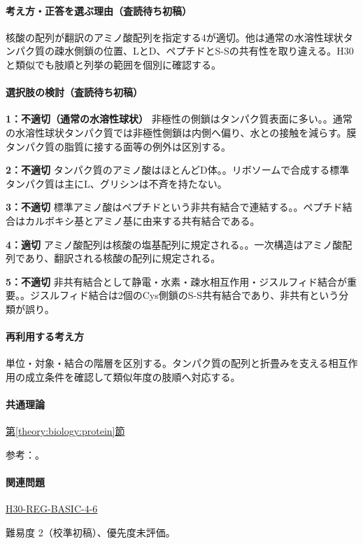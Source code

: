 \paragraph{考え方・正答を選ぶ理由（査読待ち初稿）} 核酸の配列が翻訳のアミノ酸配列を指定する4が適切。他は通常の水溶性球状タンパク質の疎水側鎖の位置、LとD、ペプチドとS-Sの共有性を取り違える。H30と類似でも肢順と列挙の範囲を個別に確認する。

\paragraph{選択肢の検討（査読待ち初稿）}\mbox{}\par

\noindent\textbf{1：不適切（通常の水溶性球状）} 非極性の側鎖はタンパク質表面に多い。。通常の水溶性球状タンパク質では非極性側鎖は内側へ偏り、水との接触を減らす。膜タンパク質の脂質に接する面等の例外は区別する。\par

\noindent\textbf{2：不適切} タンパク質のアミノ酸はほとんどD体。。リボソームで合成する標準タンパク質は主にL、グリシンは不斉を持たない。\par

\noindent\textbf{3：不適切} 標準アミノ酸はペプチドという非共有結合で連結する。。ペプチド結合はカルボキシ基とアミノ基に由来する共有結合である。\par

\noindent\textbf{4：適切} アミノ酸配列は核酸の塩基配列に規定される。。一次構造はアミノ酸配列であり、翻訳される核酸の配列に規定される。\par

\noindent\textbf{5：不適切} 非共有結合として静電・水素・疎水相互作用・ジスルフィド結合が重要。。ジスルフィド結合は2個のCys側鎖のS-S共有結合であり、非共有という分類が誤り。\par

\paragraph{再利用する考え方} 単位・対象・結合の階層を区別する。タンパク質の配列と折畳みを支える相互作用の成立条件を確認して類似年度の肢順へ対応する。

\paragraph{共通理論} \hyperref[theory:biology:protein]{第\ref*{theory:biology:protein}節}

\par 参考：\cite{mit_protein}。

\paragraph{関連問題} \hyperref[q:h30-reg-basic-4-6]{H30-REG-BASIC-4-6}

\par 難易度 2（校準初稿）、優先度未評価。
